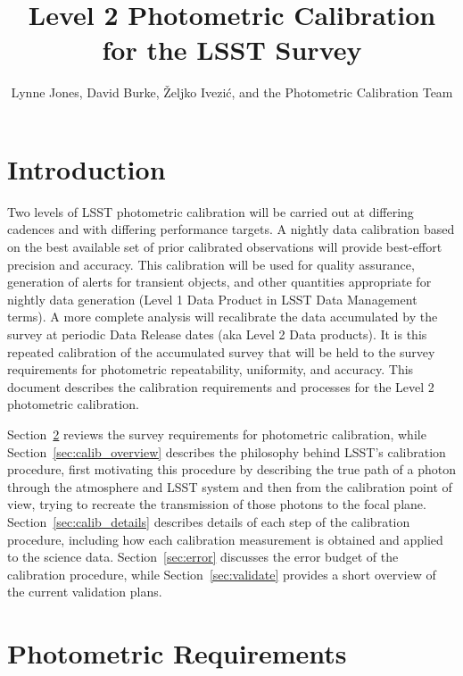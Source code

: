\documentclass[12pt,preprint]{aastex}
\begin{document}
\title{Level 2 Photometric Calibration for the LSST Survey}

\author{
Lynne Jones, David Burke, \v{Z}eljko Ivezi\'{c}, and the Photometric Calibration Team
}



\section{Introduction}


Two levels of LSST photometric calibration will be carried out at
differing cadences and with differing performance targets. A nightly
data calibration based on the best available set of prior calibrated
observations will provide best-effort precision and accuracy. This
calibration will be used for quality assurance, generation of alerts
for transient objects, and other quantities appropriate for nightly
data generation (Level 1 Data Product in LSST Data Management terms).
A more complete analysis will recalibrate the data accumulated by the
survey at periodic Data Release dates (aka Level 2 Data products).  It
is this repeated calibration of the accumulated survey that will be
held to the survey requirements for photometric repeatability,
uniformity, and accuracy.  This document describes the calibration
requirements and processes for the Level 2 photometric calibration.

Section~\ref{sec:photoreq} reviews the survey requirements for
photometric calibration, while Section~\ref{sec:calib_overview}
describes the philosophy behind LSST's calibration procedure, first
motivating this procedure by describing the true path of a photon
through the atmosphere and LSST system and then from the calibration
point of view, trying to recreate the transmission of those photons to
the focal plane.  Section~\ref{sec:calib_details} describes details of
each step of the calibration procedure, including how each calibration
measurement is obtained and applied to the science data.
Section~\ref{sec:error} discusses the error budget of the calibration
procedure, while Section~\ref{sec:validate} provides a short overview
of the current validation plans.

\section{Photometric Requirements}
\label{sec:photoreq}
\end{document}
